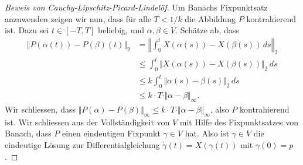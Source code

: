 \documentclass[../main.tex]{subfiles}
\begin{document}
\begin{proof}[Beweis von Cauchy-Lipschitz-Picard-Lindelöf]
  Um Banachs Fixpunktsatz anzuwenden zeigen wir nun,
  dass für alle $T < 1/k$ die Abbildung $P$ kontrahierend ist.
  Dazu sei $t \in [-T, T]$ beliebig,
  und $\alpha, \beta \in V$. Schätze ab, dass
  \begin{align*}
    \Vert P(\alpha(t)) - P(\beta)(t) \Vert_2
    & = \left\Vert \int_{0}^{t} X(\alpha(s)) - X(\beta(s)) \, ds 
    \right\Vert_2\\
    &\leq \int_{0}^{t} \Vert X(\alpha(s)) - X(\beta(s)) \Vert_2 \, ds\\
    &\leq k \int_{0}^{t} \Vert \alpha(s) - \beta(s) \Vert_2 \, ds \\
    &\leq k \cdot T \cdot \Vert \alpha - \beta \Vert_{\infty}.
  \end{align*}
  Wir schliessen, dass $\Vert P(\alpha) - P(\beta) \Vert_{\infty}
  \leq k \cdot T \cdot \Vert \alpha - \beta \Vert_{\infty}$,
  also $P$ kontrahierend ist.
  Wir schliessen aus der Vollständigkeit von $V$ 
  mit Hilfe des Fixpunktsatzes von Banach, dass $P$ 
  einen eindeutigen Fixpunkt $\gamma \in V$ hat.
  Also ist $\gamma \in V$ die eindeutige Lösung
  zur Differentialgleichung $\dot \gamma(t) = X(\gamma(t))$ 
  mit $\gamma(0) = p$.
\end{proof}
\end{document}
